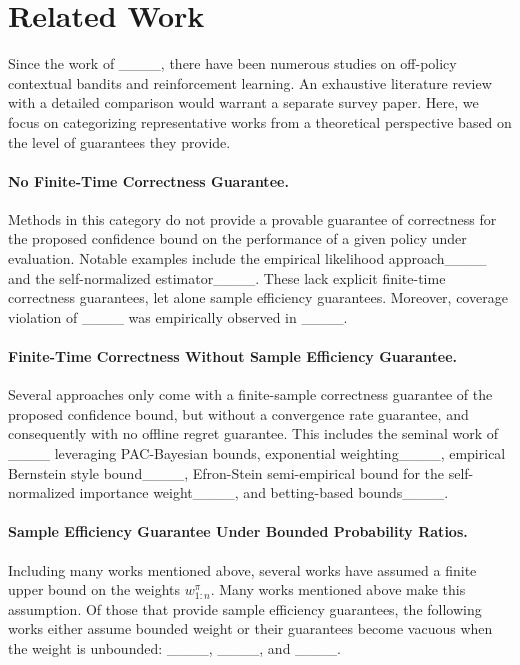 \section{Related Work}
\label{sec:related}

Since the work of ____, there have been numerous studies on off-policy contextual bandits and reinforcement learning.
An exhaustive literature review with a detailed comparison would warrant a separate survey paper.
Here, we focus on categorizing representative works from a theoretical perspective based on the level of guarantees they provide.

%
%
%

\paragraph{No Finite-Time Correctness Guarantee.}
Methods in this category do not provide a provable guarantee of correctness for the proposed confidence bound on the performance of a given policy under evaluation. Notable examples include the empirical likelihood approach____ and the self-normalized estimator____. These lack explicit finite-time correctness guarantees, let alone sample efficiency guarantees. Moreover, coverage violation of ____ was empirically observed in ____.

\paragraph{Finite-Time Correctness Without Sample Efficiency Guarantee.}
Several approaches only come with a finite-sample correctness guarantee of the proposed confidence bound, but without a convergence rate guarantee, and consequently with no offline regret guarantee.
This includes the seminal work of ____ leveraging PAC-Bayesian bounds, exponential weighting____, empirical Bernstein style bound____, Efron-Stein semi-empirical bound for the self-normalized importance weight____, and betting-based bounds____.

\paragraph{Sample Efficiency Guarantee Under Bounded Probability Ratios.}
Including many works mentioned above, several works have assumed a finite upper bound on the weights $w_{1:n}^\pi$.
%
Many works mentioned above make this assumption.
%
Of those that provide sample efficiency guarantees, the following works either assume bounded weight or their guarantees become vacuous when the weight is unbounded: ____, ____, and ____. 

